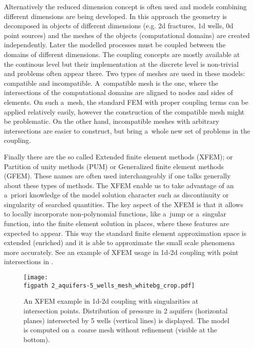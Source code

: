 Alternatively the reduced dimension concept is often used and models combining different dimensions are being developed.
In this approach the geometry is decomposed in objects of different dimensions (e.g. 2d fractures, 1d wells, 0d point sources)
and the meshes of the objects (computational domains) are created independently.
Later the modelled processes must be coupled between the domains of different dimensions.
The coupling concepts are mostly available at the continous level but their implementation
at the discrete level is non-trivial and problems often appear there.
Two types of meshes are used in these models: compatible and incompatible.
A~compatible mesh is the one, where the intersections of the computational domains are aligned to nodes and sides of elements.
On such a~mesh, the standard FEM with proper coupling terms can be applied relatively easily,
however the construction of the compatible mesh might be problematic.
On the other hand, incompatible meshes with arbitrary intersections are easier to construct, 
but bring a~whole new set of problems in the coupling.


Finally there are the so called Extended finite element methods (XFEM); or Partition of unity methods (PUM) or Generalized
finite element methods (GFEM). These names are often used interchangeably if one talks generally about these types of methods. 
The XFEM enable us to take advantage of an a~priori knowledge of the model solution character
such as discontinuity or singularity of searched quantities.
The key aspect of the XFEM is that it allows to locally incorporate non-polynomial functions, like a~jump or a~singular function,
into the finite element solution in places, where these features are expected to appear.
This way the standard finite element approximation space is extended (enriched) and it is able to approximate the small scale phenomena
more accurately.
See an example of XFEM usage in 1d-2d coupling with point intersections in .
\begin{figure}[!htb]
  \centering    
    \texttt{[image: \\figpath 2\_aquifers-5\_wells\_mesh\_whitebg\_crop.pdf]}
  \caption[XFEM example for well-aquifer model with singularities]
        { An XFEM example in 1d-2d coupling with singularities at intersection points.
            Distribution of pressure in 2 aquifers (horizontal planes) intersected by 5 wells 
            (vertical lines) is displayed. The model is computed on a~coarse mesh without refinement (visible at the bottom). }
  \label{fig:aquifers}
\end{figure}

